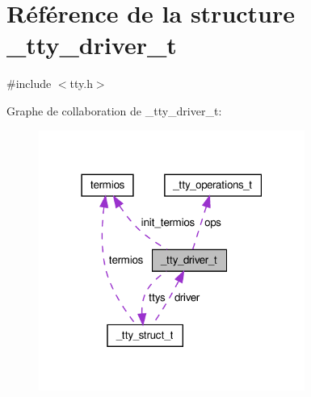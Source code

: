 \hypertarget{struct__tty__driver__t}{\section{Référence de la structure \+\_\+tty\+\_\+driver\+\_\+t}
\label{struct__tty__driver__t}
}


{\ttfamily \#include $<$tty.\+h$>$}



Graphe de collaboration de \+\_\+tty\+\_\+driver\+\_\+t\+:\nopagebreak
\begin{figure}[H]
\begin{center}
\leavevmode
\includegraphics[width=247pt]{struct__tty__driver__t__coll__graph}
\end{center}
\end{figure}
